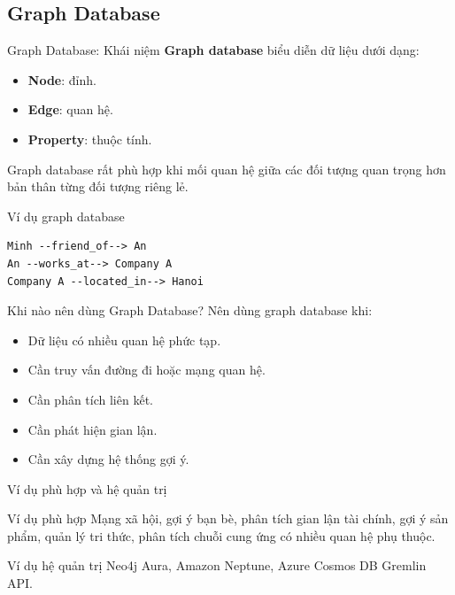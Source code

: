 \documentclass[aspectratio=169,11pt]{beamer}
\newcommand{\keyword}[1]{\textcolor{accent}{\textbf{#1}}}
\newcommand{\kw}[1]{\keyword{#1}}
\newcommand{\smallitem}{\setlength{\itemsep}{2pt}\setlength{\parskip}{0pt}}
\begin{document}
\subsection{Graph Database}

\begin{frame}{Graph Database: Khái niệm}
\kw{Graph database} biểu diễn dữ liệu dưới dạng:
\begin{itemize}
  \smallitem
  \item \kw{Node}: đỉnh.
  \item \kw{Edge}: quan hệ.
  \item \kw{Property}: thuộc tính.
\end{itemize}

Graph database rất phù hợp khi mối quan hệ giữa các đối tượng quan trọng hơn bản thân từng đối tượng riêng lẻ.
\end{frame}

\begin{frame}[fragile]{Ví dụ graph database}
\small
\begin{verbatim}
Minh --friend_of--> An
An --works_at--> Company A
Company A --located_in--> Hanoi
\end{verbatim}
\end{frame}

\begin{frame}{Khi nào nên dùng Graph Database?}
Nên dùng graph database khi:
\begin{itemize}
  \smallitem
  \item Dữ liệu có nhiều quan hệ phức tạp.
  \item Cần truy vấn đường đi hoặc mạng quan hệ.
  \item Cần phân tích liên kết.
  \item Cần phát hiện gian lận.
  \item Cần xây dựng hệ thống gợi ý.
\end{itemize}
\end{frame}

\begin{frame}{Ví dụ phù hợp và hệ quản trị}
\begin{block}{Ví dụ phù hợp}
Mạng xã hội, gợi ý bạn bè, phân tích gian lận tài chính, gợi ý sản phẩm, quản lý tri thức, phân tích chuỗi cung ứng có nhiều quan hệ phụ thuộc.
\end{block}

\begin{block}{Ví dụ hệ quản trị}
Neo4j Aura, Amazon Neptune, Azure Cosmos DB Gremlin API.
\end{block}
\end{frame}
\end{document}
